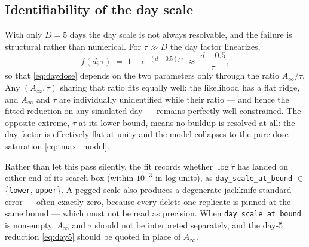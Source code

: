 \documentclass[11pt]{article}
\begin{document}
\subsection{Identifiability of the day scale}

With only $D=5$ days the day scale is not always resolvable, and the failure is
structural rather than numerical. For $\tau \gg D$ the day factor linearizes,
\begin{equation}
  f(d;\tau) \;=\; 1-e^{-(d-0.5)/\tau} \;\approx\; \frac{d-0.5}{\tau},
\end{equation}
so that \eqref{eq:daydose} depends on the two parameters only through the ratio
$A_\infty/\tau$. Any $(A_\infty,\tau)$ sharing that ratio fits equally well: the
likelihood has a flat ridge, and $A_\infty$ and $\tau$ are individually
unidentified while their ratio --- and hence the fitted reduction on any simulated
day --- remains perfectly well constrained. The opposite extreme, $\tau$ at its
lower bound, means no buildup is resolved at all: the day factor is effectively
flat at unity and the model collapses to the pure dose saturation
\eqref{eq:tmax_model}.

Rather than let this pass silently, the fit records whether $\log\widehat{\tau}$
has landed on either end of its search box (within $10^{-3}$ in log units), as
\texttt{day\_scale\_at\_bound} $\in$ \{\texttt{lower}, \texttt{upper}\}. A pegged
scale also produces a degenerate jackknife standard error --- often exactly zero,
because every delete-one replicate is pinned at the same bound --- which must not
be read as precision. When \texttt{day\_scale\_at\_bound} is non-empty, $A_\infty$
and $\tau$ should not be interpreted separately, and the day-5 reduction
\eqref{eq:day5} should be quoted in place of $A_\infty$.
\end{document}
